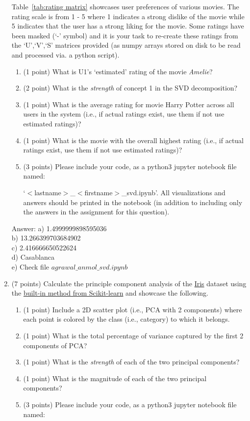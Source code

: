 \documentclass{article}%
\begin{document}
\begin{enumerate}
    Table~\ref{tab:rating matrix} showcases user preferences of various movies. The rating scale is from 1 - 5 where 1 indicates a strong dislike of the movie while 5 indicates that the user has a strong liking for the movie. Some ratings have been masked (`-' symbol) and it is your task to re-create these ratings from the `U',`V',`S' matrices provided (as numpy arrays stored on disk to be read and processed via. a python script).
    
    \begin{enumerate}
        \item (1 point) What is U1's `estimated' rating of the movie \emph{Amelie}?
        \item (2 point) What is the \emph{strength} of concept 1 in the SVD decomposition?
        \item (1 point) What is the average rating for movie Harry Potter across all users in the system (i.e., if actual ratings exist, use them if not use estimated ratings)?
        \item (1 point) What is the movie with the overall highest rating (i.e., if actual ratings exist, use them if not use estimated ratings)?
        \item (3 points) Please include your code, as a python3 jupyter notebook file named: 
        
        `$<$lastname$>$\_$<$firstname$>$\_svd.ipynb'. All visualizations and answers should be printed in the notebook (in addition to including only the answers in the assignment for this question).
    \end{enumerate}

    Answer: a) 1.4999999898595036 \\
    b) 13.266399703684902 \\
    c) 2.416666650522624 \\
    d) Casablanca \\
    e) Check file $agrawal\_anmol\_svd.ipynb$
    
    \item (7 points) Calculate the principle component analysis of the \href{https://scikit-learn.org/stable/auto_examples/datasets/plot_iris_dataset.html}{Iris} dataset using the \href{https://scikit-learn.org/stable/modules/generated/sklearn.decomposition.PCA.html}{built-in method from Scikit-learn} and showcase the following.
    \begin{enumerate}
        \item (1 point) Include a 2D scatter plot (i.e., PCA with 2 components) where each point is colored by the class (i.e., category) to which it belongs. 
        \item (1 point) What is the total percentage of variance captured by the first 2 components of PCA?
        \item (1 point) What is the \emph{strength} of each of the two principal components?
        \item (1 point) What is the magnitude of each of the two principal components?
        \item (3 points) Please include your code, as a python3 jupyter notebook file named:
        

\end{enumerate}
\end{enumerate}
\end{document}
